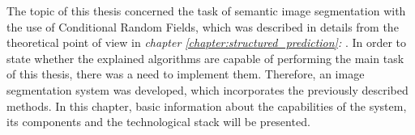 The topic of this thesis concerned the task of semantic image segmentation with the use of Conditional Random Fields, which was described in details from the theoretical point of view in \textit{chapter \ref{chapter:structured_prediction}: }. In order to state whether the explained algorithms are capable of performing the main task of this thesis, there was a need to implement them. Therefore, an image segmentation system was developed, which incorporates the previously described methods. In this chapter, basic information about the capabilities of the system, its components and the technological stack will be presented. 
